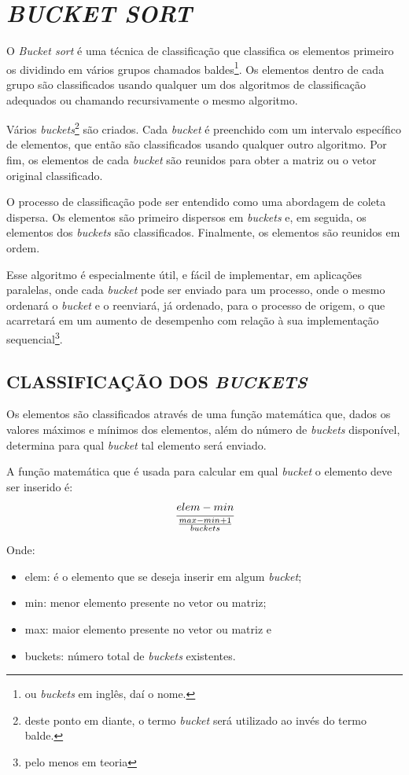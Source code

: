 \section{\normalsize \textit{BUCKET SORT}}
	O \textit{Bucket sort} é uma técnica de classificação que classifica os elementos primeiro os dividindo em vários grupos chamados baldes\footnote{ou \textit{buckets} em inglês, daí o nome.}. Os elementos dentro de cada grupo são classificados usando qualquer um dos algoritmos de classificação adequados ou chamando recursivamente o mesmo algoritmo.

Vários \textit{buckets}\footnote{deste ponto em diante, o termo \textit{bucket} será utilizado ao invés do termo balde.} são criados. Cada \textit{bucket} é preenchido com um intervalo específico de elementos, que então são  classificados usando qualquer outro algoritmo. Por fim, os elementos de cada \textit{bucket} são reunidos para obter a matriz ou o vetor original classificado.

O processo de classificação pode ser entendido como uma abordagem de coleta dispersa. Os elementos são primeiro dispersos em \textit{buckets} e, em seguida, os elementos dos \textit{buckets} são classificados. Finalmente, os elementos são reunidos em ordem.

Esse algoritmo é especialmente útil, e fácil de implementar, em aplicações paralelas, onde cada \textit{bucket} pode ser enviado para um processo, onde o mesmo ordenará o \textit{bucket} e o reenviará, já ordenado, para o processo de origem, o que acarretará em um aumento de desempenho com relação à sua implementação sequencial\footnote{pelo menos em teoria}.

	\subsection{\normalsize CLASSIFICAÇÃO DOS \textit{BUCKETS}}
		Os elementos são classificados através de uma função matemática que, dados os valores máximos e mínimos dos elementos, além do número de \textit{buckets} disponível, determina para qual \textit{bucket} tal elemento será enviado.
		
		A função matemática que é usada para calcular em qual \textit{bucket} o elemento deve ser inserido é:
		$$\cfrac{elem - min}{\frac{max - min + 1}{buckets}}$$
		
		Onde:
		\begin{itemize}
			\item elem: é o elemento que se deseja inserir em algum \textit{bucket};
			\item min: menor elemento presente no vetor ou matriz;
			\item max: maior elemento presente no vetor ou matriz e
			\item buckets: número total de \textit{buckets} existentes.
		\end{itemize}
	
